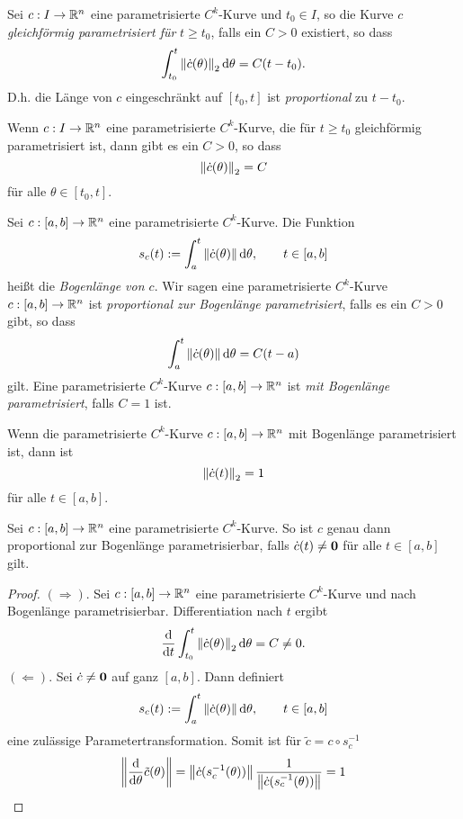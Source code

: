 \documentclass[
pdftex,
oneside,
headsepline,
11pt, 
]{scrreprt}
\begin{document}
\begin{de}
Sei $c:I\to\mathbb{R}^n$ eine parametrisierte $C^k$-Kurve und $t_0\in I$, so die Kurve $c$ \textit{gleichförmig parametrisiert für} $t\geq t_0$, falls ein $C>0$ existiert, so dass \[ \int_{t_0}^t\left\lVert\dot{c}(\theta)\right\rVert_2\mathop{}\!\mathrm{d}\theta=C(t-t_0). \] D.h. die Länge von $c$ eingeschränkt auf $[t_0,t]$ ist \textit{proportional} zu $t-t_0$.
\end{de}
\begin{lem}
	Wenn $c:I\to\mathbb{R}^n$ eine parametrisierte $C^k$-Kurve, die für $t\geq t_0$ gleichförmig parametrisiert ist, dann gibt es ein $C>0$, so dass \[\left\lVert\dot{c}(\theta)\right\rVert_2=C\] für alle $\theta\in[t_0,t]$.
\end{lem}
\begin{bsp}
	
\end{bsp}
\begin{de}[Bogenlänge]
Sei $c:[a,b]\to\mathbb{R}^n$ eine parametrisierte $C^k$-Kurve. Die Funktion \[ s_c(t):=\int_a^t \left\lVert\dot{c}(\theta)\right\rVert\mathop{}\!\mathrm{d}\theta, \qquad t\in [a,b]  \] heißt die
\textit{Bogenlänge von $c$}. Wir sagen eine parametrisierte $C^k$-Kurve $c:[a,b]\to \mathbb{R}^n$ ist
\textit{proportional zur Bogenlänge parametrisiert}, falls es ein $C>0$ gibt, so dass \[  \int_a^t \left\lVert\dot{c}(\theta)\right\rVert\mathop{}\!\mathrm{d}\theta = C(t-a)\] gilt. Eine parametrisierte $C^k$-Kurve $c:[a,b]\to \mathbb{R}^n$ ist \textit{mit Bogenlänge parametrisiert}, falls $C=1$ ist.
\end{de}
\begin{lem}
	Wenn die parametrisierte $C^k$-Kurve $c:[a,b]\to \mathbb{R}^n$ mit Bogenlänge parametrisiert ist, dann ist \[ \left\lVert\dot{c}(t)\right\rVert_2=1 \] für alle $t\in[a,b]$.
\end{lem}
\begin{theo}
	Sei $c:[a,b]\to \mathbb{R}^n$ eine parametrisierte $C^k$-Kurve. So ist $c$ genau dann proportional zur Bogenlänge parametrisierbar, falls $\dot{c}(t)\neq \textnormal{\textbf{0}}$ für alle $t\in[a,b]$ gilt.
\end{theo}
\begin{proof}
	$(\Rightarrow).$ Sei $c:[a,b]\to \mathbb{R}^n$ eine parametrisierte $C^k$-Kurve und nach Bogenlänge parametrisierbar. Differentiation nach $t$ ergibt \[ \frac{\mathop{}\!\mathrm{d}}{\mathop{}\!\mathrm{d} t} \int_{t_0}^t\left\lVert\dot{c}(\theta)\right\rVert_2\mathop{}\!\mathrm{d}\theta=C\neq 0.\]
	$(\Leftarrow).$ Sei $\dot{c}\neq \textnormal{\textbf{0}}$ auf ganz $[a,b]$. Dann definiert \[s_c(t):=\int_a^t \left\lVert\dot{c}(\theta)\right\rVert\mathop{}\!\mathrm{d}\theta, \qquad t\in [a,b] \] eine zulässige Parametertransformation. Somit ist für $\tilde{c}=c\circ s_c^{-1}$ \[\left\lVert\frac{\mathop{}\!\mathrm{d}}{\mathop{}\!\mathrm{d} \theta}\tilde{c}(\theta)\right\rVert=\left\lVert\dot{c}(s_c^{-1}(\theta))\right\rVert\frac{1}{\left\lVert\dot{c}(s_c^{-1}(\theta))\right\rVert}=1\]
\end{proof}
\end{document}
